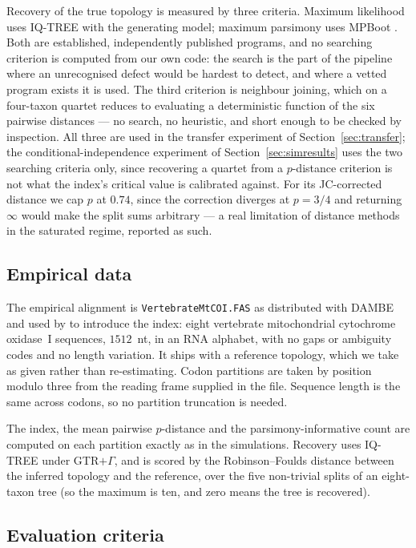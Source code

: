 \documentclass[11pt]{article}
\theoremstyle{definition}
\theoremstyle{remark}
\begin{document}
Recovery of the true topology is measured by three criteria. Maximum
likelihood uses IQ-TREE with the generating model; maximum parsimony uses
MPBoot \citep{hoang2018mpboot}. Both are established, independently published
programs, and no searching criterion is computed from our own code: the search
is the part of the pipeline where an unrecognised defect would be hardest to
detect, and where a vetted program exists it is used. The third criterion is
neighbour joining, which on a four-taxon quartet reduces to evaluating a
deterministic function of the six pairwise distances --- no search, no
heuristic, and short enough to be checked by inspection. All three are used
in the transfer experiment of Section~\ref{sec:transfer}; the
conditional-independence experiment of Section~\ref{sec:simresults} uses the
two searching criteria only, since recovering a quartet from a
$p$-distance criterion is not what the index's critical value is calibrated
against. For its
JC-corrected distance we cap $p$ at $0.74$, since the correction diverges at
$p=3/4$ and returning $\infty$ would make the split sums arbitrary --- a real
limitation of distance methods in the saturated regime, reported as such.

\subsection{Empirical data}
\label{sec:empirical-methods}

The empirical alignment is \texttt{VertebrateMtCOI.FAS} as distributed with
DAMBE and used by \citet{xia2009handbook} to introduce the index: eight
vertebrate mitochondrial cytochrome oxidase~I sequences, $1512$~nt, in an RNA
alphabet, with no gaps or ambiguity codes and no length variation. It ships
with a reference topology, which we take as given rather than re-estimating.
Codon partitions are taken by position modulo three from the reading frame
supplied in the file. Sequence length is the same across codons, so no
partition truncation is needed.

The index, the mean pairwise $p$-distance and the parsimony-informative count
are computed on each partition exactly as in the simulations. Recovery uses
IQ-TREE \citep{minh2020iqtree2} under GTR$+\Gamma$, and is scored by the
Robinson--Foulds distance between the inferred topology and the reference,
over the five non-trivial splits of an eight-taxon tree (so the maximum is
ten, and zero means the tree is recovered).

\subsection{Evaluation criteria}
\label{sec:eval}
\end{document}
